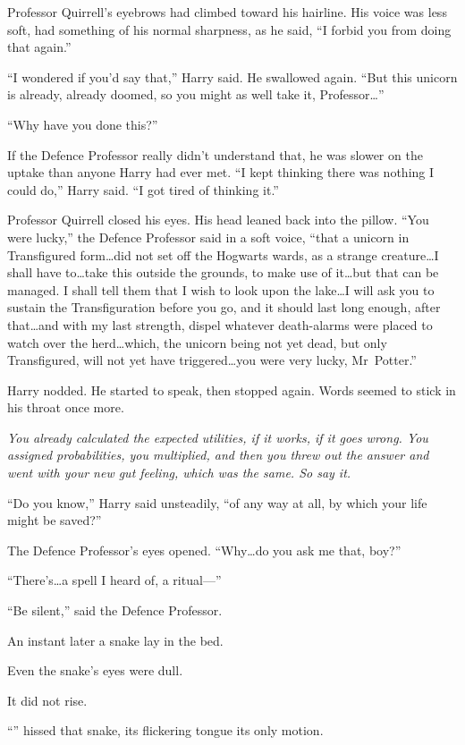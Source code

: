 Professor Quirrell’s eyebrows had climbed toward his hairline. His voice was less soft, had something of his normal sharpness, as he said, “I forbid you from doing that again.”

“I wondered if you’d say that,” Harry said. He swallowed again. “But this unicorn is already, already doomed, so you might as well take it, Professor…”

“Why have you done this?”

If the Defence Professor really didn’t understand that, he was slower on the uptake than anyone Harry had ever met. “I kept thinking there was nothing I could do,” Harry said. “I got tired of thinking it.”

Professor Quirrell closed his eyes. His head leaned back into the pillow. “You were lucky,” the Defence Professor said in a soft voice, “that a unicorn in Transfigured form…did not set off the Hogwarts wards, as a strange creature…I shall have to…take this outside the grounds, to make use of it…but that can be managed. I shall tell them that I wish to look upon the lake…I will ask you to sustain the Transfiguration before you go, and it should last long enough, after that…and with my last strength, dispel whatever death-alarms were placed to watch over the herd…which, the unicorn being not yet dead, but only Transfigured, will not yet have triggered…you were very lucky, Mr~Potter.”

Harry nodded. He started to speak, then stopped again. Words seemed to stick in his throat once more.

\emph{You already calculated the expected utilities, if it works, if it goes wrong. You assigned probabilities, you multiplied, and then you threw out the answer and went with your new gut feeling, which was the same. So say it.}

“Do you know,” Harry said unsteadily, “of any way at all, by which your life might be saved?”

The Defence Professor’s eyes opened. “Why…do you ask me that, boy?”

“There’s…a spell I heard of, a ritual—”

“Be silent,” said the Defence Professor.

An instant later a snake lay in the bed.

Even the snake’s eyes were dull.

It did not rise.

“” hissed that snake, its flickering tongue its only motion.

